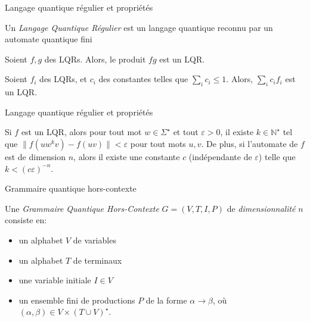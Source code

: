 \documentclass[aspectratio=169]{beamer}
\theoremstyle{plain}
\theoremstyle{definition}
\begin{document}
\begin{frame}{Langage quantique régulier et propriétés}
    \begin{definition}[LQR]
        Un \emph{Langage Quantique Régulier} est un langage quantique reconnu par un automate quantique fini
    \end{definition}

    \begin{theorem}
        Soient $f, g$ des LQRs. Alors, le produit $fg$ est un LQR.
    \end{theorem}

    \begin{theorem}
        Soient $f_i$ des LQRs, et $c_i$ des constantes telles que $\sum_i c_i \leq 1$. Alors, $\sum_i c_if_i$ est un LQR.
    \end{theorem}
\end{frame}

\begin{frame}{Langage quantique régulier et propriétés}
    \begin{theorem}
        Si $f$ est un LQR, alors pour tout mot $w\in\Sigma^\star$ et tout $\varepsilon > 0$, il existe $k\in \mathbb{N}^\star$ tel que $\|f(uw^kv) - f(uv)\| < \varepsilon$ pour tout mots $u, v$. De plus, si l'automate de $f$ est de dimension $n$, alors il existe une constante $c$ (indépendante de $\varepsilon$) telle que $k < (c\varepsilon)^{-n}$.
    \end{theorem}
\end{frame}

\begin{frame}{Grammaire quantique hors-contexte}
    \begin{definition}
        Une \emph{Grammaire Quantique Hors-Contexte} $G=(V, T, I, P)$ de \emph{dimensionnalité} $n$ consiste en:
        \begin{itemize}[label=--, noitemsep]
            \item un alphabet $V$ de variables
            \item un alphabet $T$ de terminaux
            \item une variable initiale $I\in V$
            \item un ensemble fini de productions $P$ de la forme $\alpha\to \beta$, où $(\alpha, \beta)\in V\times (T\cup V)^\star$.
        \end{itemize}
        
    \end{definition}
\end{frame}
\end{document}
